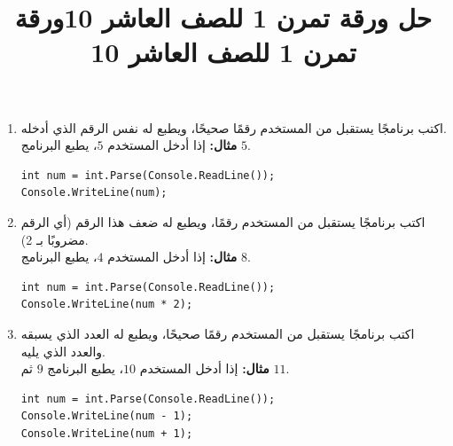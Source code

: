 \documentclass[14pt]{extarticle}
\title{حل ورقة تمرن 1 للصف العاشر 10}
\title{ورقة تمرن 1 للصف العاشر 10}
\begin{document}
\maketitle
\thispagestyle{fancy}

\begin{enumerate}[itemsep=2em]

    \item
    اكتب برنامجًا يستقبل من المستخدم رقمًا صحيحًا، ويطبع له نفس الرقم الذي أدخله. \\
    \textbf{مثال:} إذا أدخل المستخدم $5$، يطبع البرنامج $5$.
    \ifwithsols
    \begin{boxSolution}
    \begin{english}
    \begin{verbatim}
int num = int.Parse(Console.ReadLine());
Console.WriteLine(num);
    \end{verbatim}
    \end{english}
    \end{boxSolution}
    \fi

    \item
    اكتب برنامجًا يستقبل من المستخدم رقمًا، ويطبع له ضعف هذا الرقم (أي الرقم مضروبًا بـ 2). \\
    \textbf{مثال:} إذا أدخل المستخدم $4$، يطبع البرنامج $8$.
    \ifwithsols
    \begin{boxSolution}
    \begin{english}
    \begin{verbatim}
int num = int.Parse(Console.ReadLine());
Console.WriteLine(num * 2);
    \end{verbatim}
    \end{english}
    \end{boxSolution}
    \fi

    \item
    اكتب برنامجًا يستقبل من المستخدم رقمًا صحيحًا، ويطبع له العدد الذي يسبقه والعدد الذي يليه. \\
    \textbf{مثال:} إذا أدخل المستخدم $10$، يطبع البرنامج $9$ ثم $11$.
    \ifwithsols
    \begin{boxSolution}
    \begin{english}
    \begin{verbatim}
int num = int.Parse(Console.ReadLine());
Console.WriteLine(num - 1);
Console.WriteLine(num + 1);
    \end{verbatim}
    \end{english}
    \end{boxSolution}
    \clearpage
    \fi


\end{enumerate}
\end{document}
